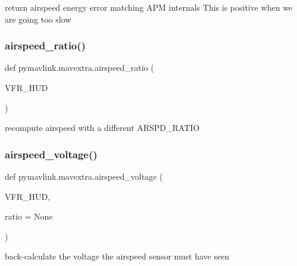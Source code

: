 \begin{DoxyVerb}return airspeed energy error matching APM internals
This is positive when we are going too slow
\end{DoxyVerb}
 \mbox{\label{namespacepymavlink_1_1mavextra_a9bc2701bc2b4da0a2e4ee303c7cecf65}} 
\subsubsection{\texorpdfstring{airspeed\+\_\+ratio()}{airspeed\_ratio()}}
{\footnotesize\ttfamily def pymavlink.\+mavextra.\+airspeed\+\_\+ratio (\begin{DoxyParamCaption}\item[{}]{V\+F\+R\+\_\+\+H\+UD }\end{DoxyParamCaption})}

\begin{DoxyVerb}recompute airspeed with a different ARSPD_RATIO\end{DoxyVerb}
 \mbox{\label{namespacepymavlink_1_1mavextra_a7e374b6fd195ee7b8efbffb17cbf84b7}} 
\subsubsection{\texorpdfstring{airspeed\+\_\+voltage()}{airspeed\_voltage()}}
{\footnotesize\ttfamily def pymavlink.\+mavextra.\+airspeed\+\_\+voltage (\begin{DoxyParamCaption}\item[{}]{V\+F\+R\+\_\+\+H\+UD,  }\item[{}]{ratio = {\ttfamily None} }\end{DoxyParamCaption})}

\begin{DoxyVerb}back-calculate the voltage the airspeed sensor must have seen\end{DoxyVerb}
 \mbox{\label{namespacepymavlink_1_1mavextra_abb4bb839562172e4585d794e68856b14}} 
